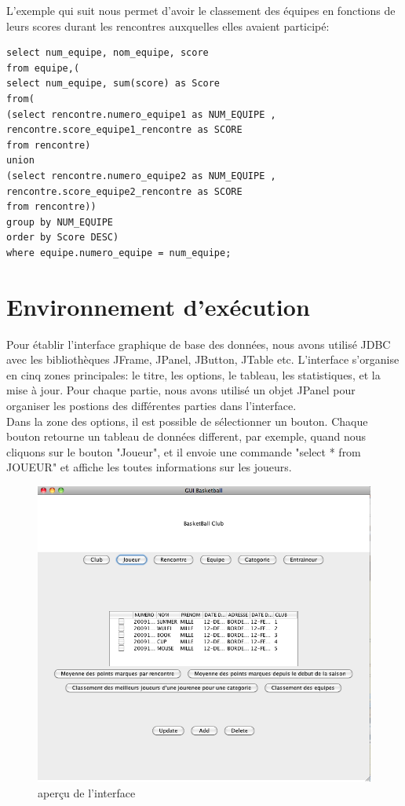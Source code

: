 \documentclass{article}
\begin{document}
L'exemple qui suit nous permet d'avoir le classement des équipes en fonctions de leurs scores durant les rencontres auxquelles elles avaient participé: \\

\begin{verbatim}
select num_equipe, nom_equipe, score
from equipe,(
select num_equipe, sum(score) as Score
from(
(select rencontre.numero_equipe1 as NUM_EQUIPE , rencontre.score_equipe1_rencontre as SCORE
from rencontre)
union
(select rencontre.numero_equipe2 as NUM_EQUIPE , rencontre.score_equipe2_rencontre as SCORE
from rencontre))
group by NUM_EQUIPE
order by Score DESC)
where equipe.numero_equipe = num_equipe;
\end{verbatim}

\newpage
\section{Environnement d'exécution}

Pour établir l'interface graphique de base des données, nous avons utilisé JDBC avec les bibliothèques JFrame, JPanel, JButton, JTable etc. L'interface s'organise en cinq zones principales: le titre, les options, le tableau, les statistiques, et la mise à jour. Pour chaque partie, nous avons utilisé un objet JPanel pour organiser les postions des différentes parties dans l'interface. \\

Dans la zone des options, il est possible de sélectionner un bouton. Chaque bouton retourne un tableau de données different, par exemple, quand nous cliquons sur le bouton "Joueur", et il envoie une commande "select * from JOUEUR" et affiche les toutes informations sur les joueurs. \\

\begin{figure}[!h]
\centering
\includegraphics[scale = 0.4] {1.png}
\caption{aperçu de l'interface}
\end{figure}
\end{document}
